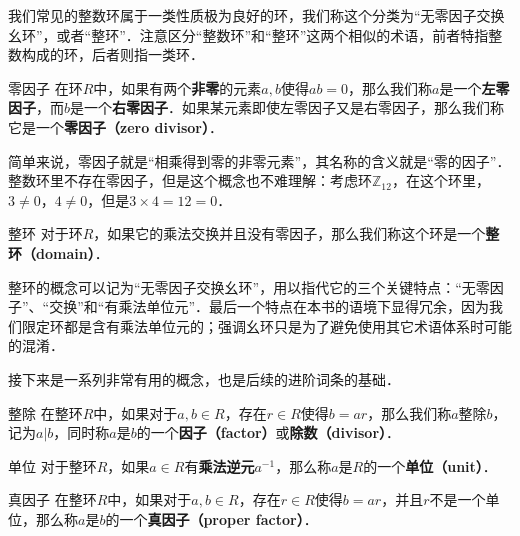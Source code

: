 


我们常见的整数环属于一类性质极为良好的环，我们称这个分类为“无零因子交换幺环”，或者“整环”．注意区分“整数环”和“整环”这两个相似的术语，前者特指整数构成的环，后者则指一类环．

\begin{definition}{零因子}
在环$R$中，如果有两个\textbf{非零}的元素$a, b$使得$ab=0$，那么我们称$a$是一个\textbf{左零因子}，而$b$是一个\textbf{右零因子}．如果某元素即使左零因子又是右零因子，那么我们称它是一个\textbf{零因子（zero divisor）}．
\end{definition}

简单来说，零因子就是“相乘得到零的非零元素”，其名称的含义就是“零的因子”．整数环里不存在零因子，但是这个概念也不难理解：考虑环$\mathbb{Z}_{12}$，在这个环里，$3\not=0$，$4\not=0$，但是$3\times 4=12=0$．

\begin{definition}{整环}
对于环$R$，如果它的乘法交换并且没有零因子，那么我们称这个环是一个\textbf{整环（domain）}．
\end{definition}

整环的概念可以记为“无零因子交换幺环”，用以指代它的三个关键特点：“无零因子”、“交换”和“有乘法单位元”．最后一个特点在本书的语境下显得冗余，因为我们限定环都是含有乘法单位元的；强调幺环只是为了避免使用其它术语体系时可能的混淆．

接下来是一系列非常有用的概念，也是后续的进阶词条的基础．

\begin{definition}{整除}
在整环$R$中，如果对于$a, b\in R$，存在$r\in R$使得$b=ar$，那么我们称$a$整除$b$，记为$a|b$，同时称$a$是$b$的一个\textbf{因子（factor）}或\textbf{除数（divisor）}．
\end{definition}

\begin{definition}{单位}
对于整环$R$，如果$a\in R$有\textbf{乘法逆元}$a^{-1}$，那么称$a$是$R$的一个\textbf{单位（unit）}．
\end{definition}

\begin{definition}{真因子}
在整环$R$中，如果对于$a, b\in R$，存在$r\in R$使得$b=ar$，并且$r$不是一个单位，那么称$a$是$b$的一个\textbf{真因子（proper factor）}．
\end{definition}





